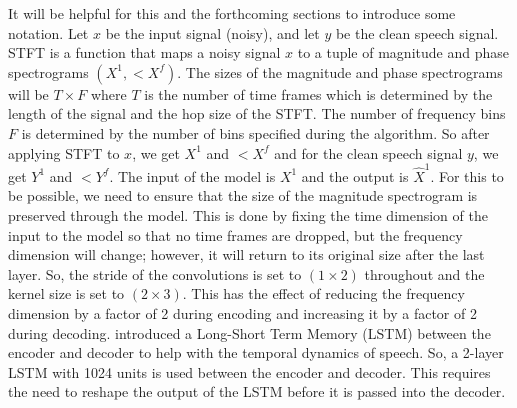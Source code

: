 \documentclass[logo,bsc,singlespacing,parskip,online]{infthesis}
\begin{document}
It will be helpful for this and the forthcoming sections to introduce some notation.
Let $x$ be the input signal (noisy), and let $y$ be the clean speech signal. 
STFT is a function that maps a noisy signal $x$ to a tuple of magnitude and phase spectrograms $(X^{1}, <X^{f})$.
The sizes of the magnitude and phase spectrograms will be $T \times F$ where $T$ is the number of time frames which is 
determined by the length of the signal and the hop size of the STFT. The number of frequency bins $F$ is determined by the 
number of bins specified during the algorithm.
So after applying STFT to $x$, we get $X^{1}$ and $<X^{f}$ and for the clean speech signal $y$, we get $Y^{1}$ and $<Y^{f}$.
The input of the model is $X^{1}$ and the output is $\hat{X}^{1}$. For this to be possible, we need to ensure that the size of the 
magnitude spectrogram is preserved through the model. This is done by fixing the time dimension of the input to the model 
so that no time frames are dropped, but the frequency dimension will change; however, it will return to its original size after the last layer.
So, the stride of the convolutions is set to $(1 \times 2)$ throughout and the kernel size is set to $(2 \times 3)$. 
This has the effect of reducing the frequency dimension by a factor of 2 during encoding and increasing it by a factor of 2 during decoding.
\citet{tan18_interspeech} introduced a Long-Short Term Memory (LSTM) between the encoder and decoder to help with 
the temporal dynamics of speech. So, a 2-layer LSTM with 1024 units is used between the encoder and decoder. This 
requires the need to reshape the output of the LSTM before it is passed into the decoder.
\end{document}
